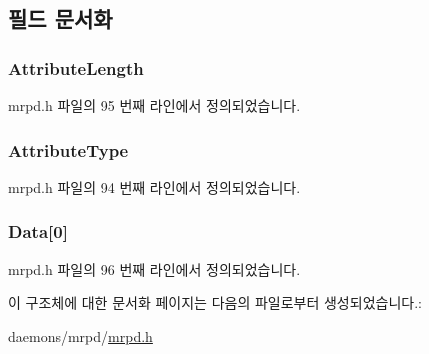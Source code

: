 \subsection{필드 문서화}
\subsubsection[{\texorpdfstring{Attribute\+Length}{AttributeLength}}]{ Attribute\+Length}\hypertarget{structmrpdu__message_a5f2b49cd60c758023398b61c08f28e94}{}\label{structmrpdu__message_a5f2b49cd60c758023398b61c08f28e94}


mrpd.\+h 파일의 95 번째 라인에서 정의되었습니다.

\subsubsection[{\texorpdfstring{Attribute\+Type}{AttributeType}}]{ Attribute\+Type}\hypertarget{structmrpdu__message_a3dd83acf51706885c5b37387a958a010}{}\label{structmrpdu__message_a3dd83acf51706885c5b37387a958a010}


mrpd.\+h 파일의 94 번째 라인에서 정의되었습니다.

\subsubsection[{\texorpdfstring{Data}{Data}}]{ Data\mbox{[}0\mbox{]}}\hypertarget{structmrpdu__message_a365ab2667948b1615e9662e639e27dcb}{}\label{structmrpdu__message_a365ab2667948b1615e9662e639e27dcb}


mrpd.\+h 파일의 96 번째 라인에서 정의되었습니다.



이 구조체에 대한 문서화 페이지는 다음의 파일로부터 생성되었습니다.\+:\begin{DoxyCompactItemize}
\item 
daemons/mrpd/\hyperlink{mrpd_8h}{mrpd.\+h}\end{DoxyCompactItemize}
